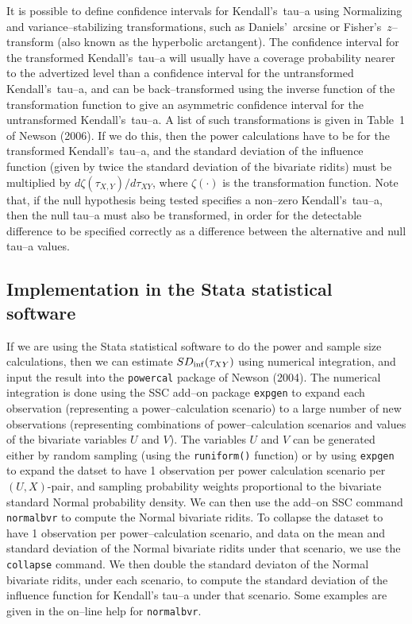 \documentclass[a4paper]{article}      %
\begin{document}
It is possible to define confidence intervals for Kendall's~tau--a using Normalizing and variance--stabilizing transformations,
such as Daniels'~arcsine or Fisher's~$z$--transform (also known as the hyperbolic arctangent).
The confidence interval for the transformed Kendall's~tau--a will usually have a coverage probability
nearer to the advertized level than a confidence interval for the untransformed Kendall's~tau--a,
and can be back--transformed using the inverse function of the transformation function
to give an asymmetric confidence interval for the untransformed Kendall's~tau--a.
A list of such transformations is given in Table~1 of Newson (2006)\cite{newson2006}.
If we do this, then the power calculations have to be for the transformed Kendall's~tau--a,
and the standard deviation of the influence function (given by twice the standard deviation of the bivariate ridits)
must be multiplied by $d \zeta (\tau_{X,Y}) / d \tau_{XY}$,
where $\zeta(\cdot)$ is the transformation function.
Note that, if the null hypothesis being tested specifies a non--zero Kendall's~tau--a,
then the null tau--a must also be transformed,
in order for the detectable difference to be specified correctly
as a difference between the alternative and null tau--a values.

\subsection{Implementation in the Stata statistical software}

If we are using the Stata statistical software\cite{statacorpversion} to do the power and sample size calculations,
then we can estimate $SD_{\rm inf}(\tau_{XY})$ using numerical integration,
and input the result into the \texttt{powercal} package of Newson (2004)\cite{newson2004}.
The numerical integration is done using the SSC add--on package \texttt{expgen}
to expand each observation (representing a power--calculation scenario)
to a large number of new observations
(representing combinations of power--calculation scenarios and values of the bivariate variables $U$ and $V$).
The variables $U$ and $V$ can be generated either by random sampling
(using the \texttt{runiform()} function)
or by using \texttt{expgen} to expand the datset to have 1 observation
per power calculation scenario per $(U,X)$-pair,
and sampling probability weights proportional to the bivariate standard Normal probability density.
We can then use the add--on SSC command \texttt{normalbvr}
to compute the Normal bivariate ridits.
To collapse the dataset to have 1 observation per power--calculation scenario,
and data on the mean and standard deviation of the Normal bivariate ridits under that scenario,
we use the \texttt{collapse} command.
We then double the standard deviaton of the Normal bivariate ridits, under each scenario,
to compute the standard deviation of the influence function for Kendall's tau--a under that scenario.
Some examples are given in the on--line help
for \texttt{normalbvr}.
\end{document}
